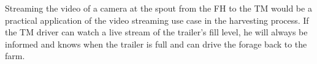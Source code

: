 Streaming the video of a camera at the spout from the \ac{FH} to the \ac{TM} would be a practical application of the video streaming use case in the harvesting process. If the \ac{TM} driver can watch a live stream of the trailer's fill level, he will always be
informed and knows when the trailer is full and can drive the forage back to the
farm.

